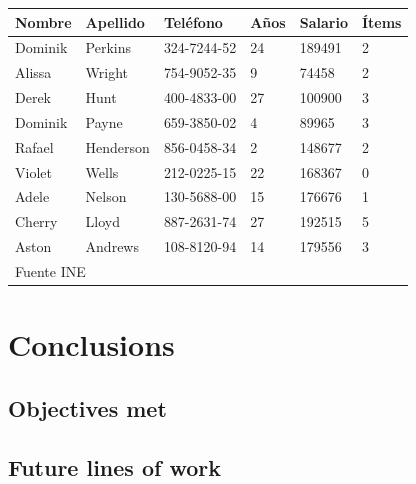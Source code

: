 \documentclass[12pt]{report} %
\begin{document}
\lipsum[5-7]	

\begin{table} [h]
	{\begin{tabular}{|p{1.75cm}|p{2cm}|p{2.5cm}|p{1.5cm}|p{2.5cm}|p{1.5cm}|}
		\hline
		\rowcolor{gray75}	
		Nombre & Apellido & Teléfono & Años & Salario & Ítems \\
		\hline 
		Dominik & Perkins & 324-7244-52 & 24 & 189491 & 2 \\
		\hline
		Alissa & Wright & 754-9052-35 & 9 & 74458 & 2 \\
		\hline
		Derek & Hunt & 400-4833-00 & 27 & 100900 & 3 \\
		\hline
		Dominik & Payne & 659-3850-02 & 4 & 89965 & 3 \\
		\hline
		Rafael & Henderson & 856-0458-34 & 2 & 148677 & 2 \\
		\hline
		Violet & Wells & 212-0225-15 & 22 & 168367 & 0\\
		\hline
		Adele & Nelson & 130-5688-00 & 15 & 176676 & 1 \\
		\hline
		Cherry & Lloyd & 887-2631-74 & 27 & 192515 & 5 \\
		\hline
		Aston & Andrews & 108-8120-94 & 14 & 179556 & 3 \\
		\hline
		\multicolumn{6}{|l|}{Fuente INE} \\
		\hline
	\end{tabular}}
\end{table}

\lipsum[6]

\chapter{Conclusions}

\section{Objectives met}
\lipsum[15-16]

\section{Future lines of work}
\lipsum[12-13]

	


\nocite{*} %
\end{document}

